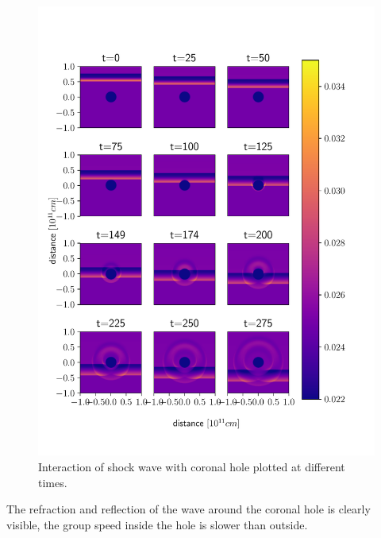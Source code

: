 \begin{figure}[H]
	\centering
	\includegraphics[width=\linewidth]{images/coronal-hole.pdf}
	\caption{Interaction of shock wave with coronal hole plotted at different times.}
	\label{fig:coronal-hole}
\end{figure}

The refraction and reflection of the wave around the coronal hole is clearly visible, the group speed inside the hole is slower than outside.

